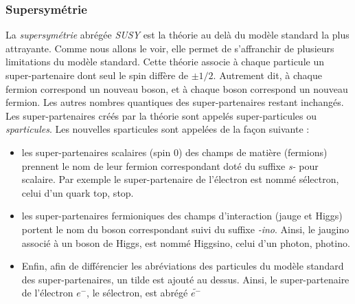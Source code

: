    

  \subsubsection{Supersym\'etrie}
  
  La \textit{supersym\'etrie} abr\'eg\'ee \textit{SUSY} est la th\'eorie au delà du mod\`ele standard la plus attrayante. Comme nous allons le voir, elle permet de s'affranchir de plusieurs limitations du mod\`ele standard. Cette th\'eorie associe \`a chaque particule un super-partenaire dont seul le spin diff\`ere de $\pm 1/2$. Autrement dit, \`a chaque fermion correspond un nouveau boson, et \`a chaque boson correspond un nouveau fermion. Les autres nombres quantiques des super-partenaires restant inchang\'es. Les super-partenaires cr\'e\'es par la th\'eorie sont appel\'es super-particules ou \textit{sparticules}. Les nouvelles sparticules sont appel\'ees de la façon suivante :
 
  \medskip
 
  \renewcommand{\labelitemi}{$\bullet$}
  \begin{itemize}
   \item les super-partenaires scalaires (spin 0) des champs de mati\`ere (fermions) prennent le nom de leur fermion correspondant dot\'e du suffixe \textit{s-} pour scalaire. Par exemple le super-partenaire de l'\'electron est nomm\'e s\'electron, celui d'un quark top, stop. 
   \item {les super-partenaires fermioniques des champs d'interaction (jauge et Higgs) portent le nom du boson correspondant suivi du suffixe \textit{-ino}. Ainsi, le jaugino associ\'e \`a un boson de Higgs, est nomm\'e Higgsino, celui d'un photon, photino.}
   \item Enfin, afin de diff\'erencier les abr\'eviations des particules du mod\`ele standard des super-partenaires, un tilde est ajout\'e au dessus. Ainsi, le super-partenaire de l'\'electron $e^-$, le s\'electron, est abr\'eg\'e $\widetilde{e^-}$
  \end{itemize}

  \medskip
  
